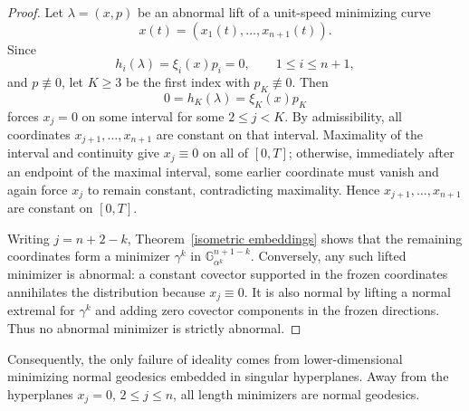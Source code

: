 \documentclass[12pt]{amsart}
\numberwithin{equation}{section}
\theoremstyle{plain}
\theoremstyle{definition}
\theoremstyle{remark}
\begin{document}
\begin{proof}
    Let \(\lambda=(x,p)\) be an abnormal lift of a unit-speed minimizing curve
    \[x(t)=(x_1(t),\ldots,x_{n+1}(t)).\] Since
    \[
        h_i(\lambda)=\xi_i(x)p_i=0,
        \qquad 1\leq i\leq n+1,
    \]
    and \(p\not\equiv0\), let \(K\geq 3\) be the first index with \(p_K\not\equiv0\). Then
    \[
        0=h_K(\lambda)=\xi_K(x)p_K
    \]
    forces \(x_j=0\) on some interval for some \(2\leq j<K\). By admissibility, all
    coordinates \(x_{j+1},\ldots,x_{n+1}\) are constant on that interval. Maximality of the
    interval and continuity give \(x_j\equiv0\) on all of \([0,T]\); otherwise, immediately
    after an endpoint of the maximal interval, some earlier coordinate must vanish and again
    force \(x_j\) to remain constant, contradicting maximality. Hence
    \(x_{j+1},\ldots,x_{n+1}\) are constant on \([0,T]\).

    Writing \(j=n+2-k\), Theorem~\ref{isometric embeddings} shows that the remaining
    coordinates form a minimizer \(\gamma^k\) in
    \(\mathbb G^{n+1-k}_{\alpha^k}\). Conversely, any such lifted minimizer is abnormal: a
    constant covector supported in the frozen coordinates annihilates the distribution because
    \(x_j\equiv0\). It is also normal by lifting a normal extremal for \(\gamma^k\) and adding
    zero covector components in the frozen directions. Thus no abnormal minimizer is strictly
    abnormal.
\end{proof}
Consequently, the only failure of ideality comes from lower-dimensional minimizing normal geodesics embedded in singular hyperplanes. Away from the hyperplanes \(x_j=0\),
\(2\leq j\leq n\), all length minimizers are normal geodesics.
\end{document}
